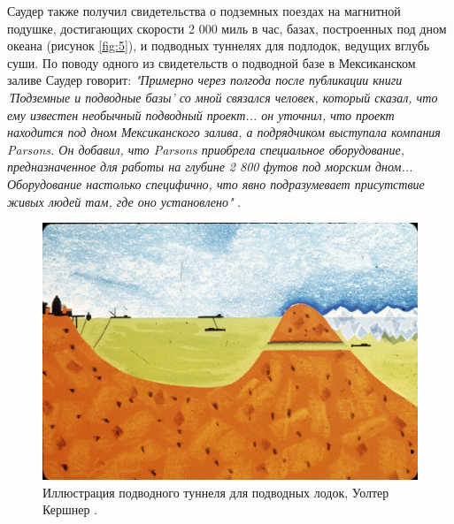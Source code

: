 \documentclass[10pt,twocolumn,letterpaper]{article}
\begin{document}
Саудер также получил свидетельства о подземных поездах на магнитной подушке, достигающих скорости 2 000 миль в час, базах, построенных под дном океана (рисунок \ref{fig:5}), и подводных туннелях для подлодок, ведущих вглубь суши. По поводу одного из свидетельств о подводной базе в Мексиканском заливе Саудер говорит: \textit{"Примерно через полгода после публикации книги 'Подземные и подводные базы' со мной связался человек, который сказал, что ему известен необычный подводный проект... он уточнил, что проект находится под дном Мексиканского залива, а подрядчиком выступала компания Parsons. Он добавил, что Parsons приобрела специальное оборудование, предназначенное для работы на глубине 2 800 футов под морским дном... Оборудование настолько специфично, что явно подразумевает присутствие живых людей там, где оно установлено"} \cite{22}.
\begin{figure}[t]
\begin{center}
   \includegraphics[width=1\linewidth]{sub.jpg}
\end{center}
   \caption{Иллюстрация подводного туннеля для подводных лодок, Уолтер Кершнер \cite{22,23}.}
\label{fig:6}
\label{fig:onecol}
\end{figure}
\end{document}
